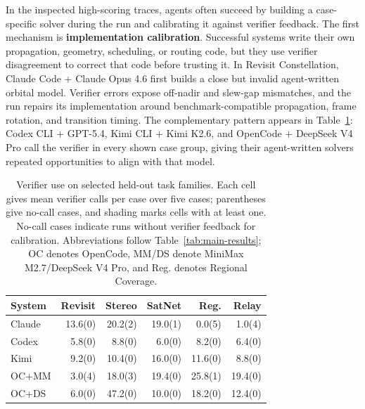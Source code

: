 \documentclass[11pt]{article}
\begin{document}
In the inspected high-scoring traces, agents often succeed by building a case-specific solver during the run and calibrating it against verifier feedback. The first mechanism is \textbf{implementation calibration}. Successful systems write their own propagation, geometry, scheduling, or routing code, but they use verifier disagreement to correct that code before trusting it. In Revisit Constellation, Claude Code + Claude Opus 4.6 first builds a close but invalid agent-written orbital model. Verifier errors expose off-nadir and slew-gap mismatches, and the run repairs its implementation around benchmark-compatible propagation, frame rotation, and transition timing. The complementary pattern appears in Table~\ref{tab:verifier-calls}: Codex CLI + GPT-5.4, Kimi CLI + Kimi K2.6, and OpenCode + DeepSeek V4 Pro call the verifier in every shown case group, giving their agent-written solvers repeated opportunities to align with that model.

\begin{table}[t]
\centering
\footnotesize
\setlength{\tabcolsep}{3.2pt}
\begin{tabular}{lrrrrr}
\hline
System & Revisit & Stereo & SatNet & Reg. & Relay \\
\hline
Claude & 13.6(0) & \cellcolor{zerocallcell}20.2(2) & \cellcolor{zerocallcell}19.0(1) & \cellcolor{zerocallcell}0.0(5) & \cellcolor{zerocallcell}1.0(4) \\
Codex & 5.8(0) & 8.8(0) & 6.0(0) & 8.2(0) & 6.4(0) \\
Kimi & 9.2(0) & 10.4(0) & 16.0(0) & 11.6(0) & 8.8(0) \\
OC+MM & \cellcolor{zerocallcell}3.0(4) & \cellcolor{zerocallcell}18.0(3) & 19.4(0) & \cellcolor{zerocallcell}25.8(1) & 19.4(0) \\
OC+DS & 6.0(0) & 47.2(0) & 10.0(0) & 18.2(0) & 12.4(0) \\
\hline
\end{tabular}
\caption{Verifier use on selected held-out task families. Each cell gives mean verifier calls per case over five cases; parentheses give no-call cases, and shading marks cells with at least one. No-call cases indicate runs without verifier feedback for calibration. Abbreviations follow Table~\ref{tab:main-results}; OC denotes OpenCode, MM/DS denote MiniMax M2.7/DeepSeek V4 Pro, and Reg. denotes Regional Coverage.}
\label{tab:verifier-calls}
\end{table}
\end{document}
